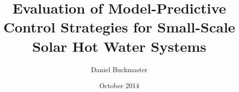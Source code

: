 \documentclass[oneside]{book}
\title{Evaluation of Model-Predictive Control Strategies for Small-Scale Solar Hot Water Systems}
\author{Daniel Buckmaster}
\date{October 2014}
\begin{document}
\frontmatter
   \maketitle
   
   
   
   \tableofcontents
   \listoffigures
   \listoftodos

\mainmatter
   
   
   
   
   
   
   

\begin{appendices}
   
\end{appendices}

\backmatter
   \printbibliography[heading = bibintoc]
\end{document}
